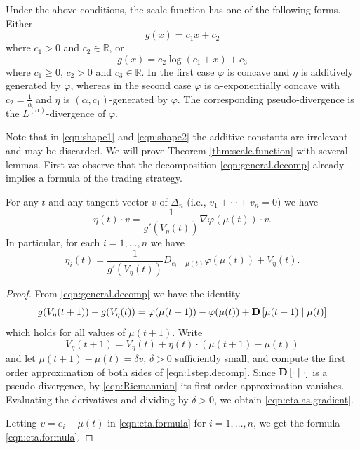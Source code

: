 \documentclass[graybox]{svmult}
\begin{document}
\begin{theorem} \label{thm:scale.function}
Under the above conditions, the scale function has one of the following forms.  Either
\begin{equation} \label{eqn:shape1}
g(x) = c_1 x + c_2
\end{equation}
where $c_1 > 0$ and $c_2 \in \mathbb{R}$, or
\begin{equation} \label{eqn:shape2}
g(x) = c_2 \log(c_1 + x) + c_3
\end{equation}
where $c_1 \geq 0$, $c_2 > 0$ and $c_3 \in \mathbb{R}$. In the first case $\varphi$ is concave and $\eta$ is additively generated by $\varphi$, whereas in the second case $\varphi$ is $\alpha$-exponentially concave with $c_2 = \frac{1}{\alpha}$ and $\eta$ is $(\alpha, c_1)$-generated by $\varphi$. The corresponding pseudo-divergence is the $L^{(\alpha)}$-divergence of $\varphi$.
\end{theorem}

Note that in \eqref{eqn:shape1} and \eqref{eqn:shape2} the additive constants are irrelevant and may be discarded. We will prove Theorem \ref{thm:scale.function} with several lemmas. First we observe that the decomposition \eqref{eqn:general.decomp} already implies a formula of the trading strategy.

\begin{lemma}
For any $t$ and any tangent vector $v$ of $\Delta_n$ (i.e., $v_1 + \cdots + v_n = 0$) we have
\begin{equation} \label{eqn:eta.as.gradient}
\eta(t) \cdot v  =  \frac{1}{g'(V_{\eta}(t))} \nabla \varphi(\mu(t)) \cdot  v.
\end{equation}
In particular, for each $i = 1, \ldots, n$ we have
\begin{equation} \label{eqn:eta.formula}
\eta_i(t) = \frac{1}{g'(V_{\eta}(t))} D_{e_i - \mu(t)} \varphi(\mu(t)) + V_{\eta}(t).
\end{equation}
\end{lemma}
\begin{proof}
From \eqref{eqn:general.decomp} we have the identity
\begin{equation} \label{eqn:1step.decomp}
g(V_{\eta}(t + 1)) - g(V_{\eta}(t)) = \varphi(\mu(t + 1)) - \varphi(\mu(t)) + {\bf D}\left[ \mu(t + 1) \mid \mu(t) \right]
\end{equation}
which holds for all values of $\mu(t + 1)$. Write
\[
V_{\eta}(t + 1) = V_{\eta}(t) + \eta(t) \cdot (\mu(t + 1) - \mu(t))
\]
and let $\mu(t + 1) - \mu(t) = \delta v$, $\delta > 0$ sufficiently small, and compute the first order approximation of both sides of \eqref{eqn:1step.decomp}. Since ${\bf D}\left[ \cdot \mid \cdot \right]$ is a pseudo-divergence, by \eqref{eqn:Riemannian} its first order approximation vanishes. Evaluating the derivatives and dividing by $\delta > 0$, we obtain \eqref{eqn:eta.as.gradient}.

Letting $v = e_i - \mu(t)$ in \eqref{eqn:eta.formula} for $i = 1, \ldots, n$, we get the formula \eqref{eqn:eta.formula}.
\end{proof}
\end{document}
